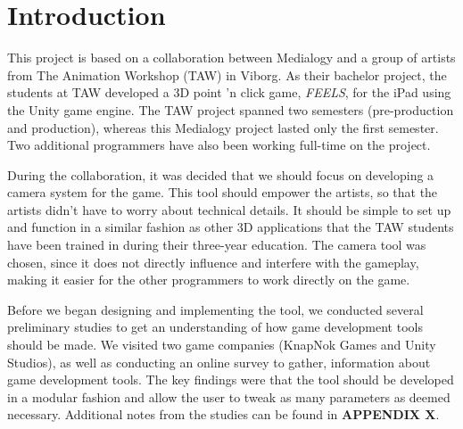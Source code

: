 \section{Introduction}


This project is based on a collaboration between Medialogy and a group of artists from The Animation Workshop (TAW) in Viborg. As their bachelor project, the students at TAW developed a 3D point 'n click game, \textit{FEELS}, for the iPad using the Unity game engine. The TAW project spanned two semesters (pre-production and production), whereas this Medialogy project lasted only the first semester. Two additional programmers have also been working full-time on the project.

During the collaboration, it was decided that we should focus on developing a camera system for the game. This tool should empower the artists, so that the artists didn't have to worry about technical details. It should be simple to set up and function in a similar fashion as other 3D applications that the TAW students have been trained in during their three-year education. The camera tool was chosen, since it does not directly influence and interfere with the gameplay, making it easier for the other programmers to work directly on the game.

Before we began designing and implementing the tool, we conducted several preliminary studies to get an understanding of how game development tools should be made. We visited two game companies (KnapNok Games and Unity Studios), as well as conducting an online survey to gather, information about game development tools. The key findings were that the tool should be developed in a modular fashion and allow the user to tweak as many parameters as deemed necessary. Additional notes from the studies can be found in \textbf{APPENDIX X}.